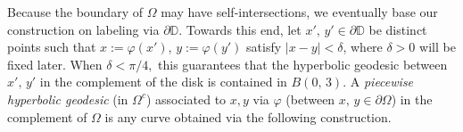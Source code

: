 \documentclass[reqno,11pt]{amsart}
\def\rr{{\mathbb R}}
\def\wz{\widetilde}
\numberwithin{equation}{section}
\theoremstyle{remark}
\begin{document}

Because the boundary of $\Omega$ may have self-intersections, we eventually base our
construction on labeling via $\partial \mathbb{D}.$ Towards this end,
let $x',\, y'\in \partial \mathbb{D}$ be distinct points such that  $x:=\varphi(x')$, $y:=\varphi(y')$ satisfy $|x-y|<\delta$, where
$\delta>0$ will be fixed later. When $\delta<\pi/4,$
this guarantees that the hyperbolic geodesic between $x',\,y'$ in the complement
of the disk is contained in $B(0,\,3).$ 
A {\it piecewise hyperbolic geodesic} (in $\Omega^c$) associated to
$x,y$ via $\varphi$ (between 
$x,\,y \in \partial \Omega$) in the complement of  
$\Omega$ is any curve obtained via the following construction. 
%
%
%
%


\end{document}
